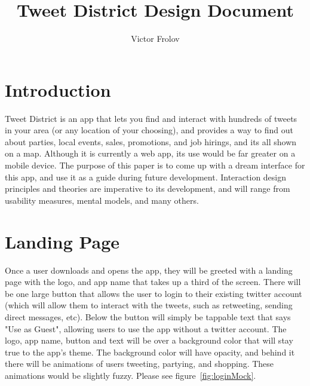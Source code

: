 \documentclass[11pt]{article}
\title{Tweet District Design Document}
\author{Victor Frolov}
\begin{document}
\maketitle

\section{Introduction}
Tweet District is an app that lets you find and interact with hundreds of tweets in your area (or any location of your choosing), and provides a way to find out about parties, local events, sales, promotions, and job hirings, and its all shown on a map. Although it is currently a web app, its use would be far greater on a mobile device. The purpose of this paper is to come up with a dream interface for this app, and use it as a guide during future development. Interaction design principles and theories are imperative to its development, and will range from usability measures, mental models, and many others.


\section{Landing Page}
Once a user downloads and opens the app, they will be greeted with a landing page with the logo, and app name that takes up a third of the screen. There will be one large button that allows the user to login to their existing twitter account (which will allow them to interact with the tweets, such as retweeting, sending direct messages, etc). Below the button will simply be tappable text that says "Use as Guest", allowing users to use the app without a twitter account. The logo, app name, button and text will be over a background color that will stay true to the app's theme. The background color will have opacity, and behind it there will be animations of users tweeting, partying, and shopping. These animations would be slightly fuzzy. Please see figure~\ref{fig:loginMock}.
\end{document}
